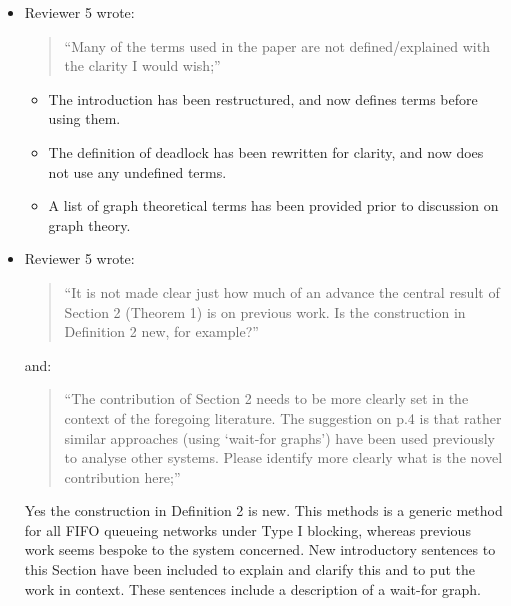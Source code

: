 \documentclass{article}
\begin{document}
\begin{itemize}

\item Reviewer 5 wrote:
\begin{quote}
``Many of the terms used in the paper are not defined/explained with the
clarity I would wish;''
\end{quote}
\begin{itemize}
\item The introduction has been restructured, and now defines terms before
using them.
\item The definition of deadlock has been rewritten for clarity, and now does
not use any undefined terms.
\item A list of graph theoretical terms has been provided prior to discussion
on graph theory.
\end{itemize}


\item Reviewer 5 wrote:
\begin{quote}
``It is not made clear just how much of an advance the central result of
Section 2 (Theorem 1) is on previous work.
Is the construction in Definition 2 new, for example?''
\end{quote}

and:

\begin{quote}
``The contribution of Section 2 needs to be more clearly set in the context
of the foregoing literature.
The suggestion on p.4 is that rather similar approaches (using ‘wait-for
graphs’) have been used previously to analyse other systems.
Please identify more clearly what is the novel contribution here;''
\end{quote}

Yes the construction in Definition 2 is new.
This methods is a generic method for all FIFO queueing networks under Type I
blocking, whereas previous work seems bespoke to the system concerned.
New introductory sentences to this Section have been included to explain and
clarify this and to put the work in context.
These sentences include a description of a wait-for graph.



\end{itemize}
\end{document}
